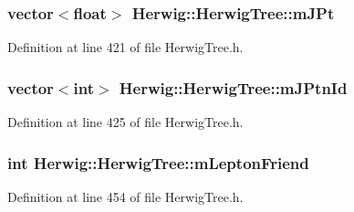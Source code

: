 \subsubsection[{\texorpdfstring{m\+J\+Pt}{mJPt}}]{\setlength{\rightskip}{0pt plus 5cm}vector$<$float$>$ Herwig\+::\+Herwig\+Tree\+::m\+J\+Pt\hspace{0.3cm}{\ttfamily [protected]}}\hypertarget{class_herwig_1_1_herwig_tree_ae26408eb10df0fc5643022ea718b73ba}{}\label{class_herwig_1_1_herwig_tree_ae26408eb10df0fc5643022ea718b73ba}


Definition at line 421 of file Herwig\+Tree.\+h.

\subsubsection[{\texorpdfstring{m\+J\+Ptn\+Id}{mJPtnId}}]{\setlength{\rightskip}{0pt plus 5cm}vector$<$int$>$ Herwig\+::\+Herwig\+Tree\+::m\+J\+Ptn\+Id\hspace{0.3cm}{\ttfamily [protected]}}\hypertarget{class_herwig_1_1_herwig_tree_aae0a968baf348f5b1b34c0eae9225042}{}\label{class_herwig_1_1_herwig_tree_aae0a968baf348f5b1b34c0eae9225042}


Definition at line 425 of file Herwig\+Tree.\+h.

\subsubsection[{\texorpdfstring{m\+Lepton\+Friend}{mLeptonFriend}}]{\setlength{\rightskip}{0pt plus 5cm}int Herwig\+::\+Herwig\+Tree\+::m\+Lepton\+Friend\hspace{0.3cm}{\ttfamily [protected]}}\hypertarget{class_herwig_1_1_herwig_tree_a3dc3453c672a72bce7ca90d9216e7df8}{}\label{class_herwig_1_1_herwig_tree_a3dc3453c672a72bce7ca90d9216e7df8}


Definition at line 454 of file Herwig\+Tree.\+h.

